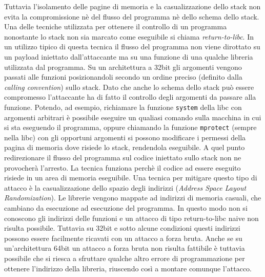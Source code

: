Tuttavia l'isolamento delle pagine di memoria e la casualizzazione
dello stack non evita la compromissione nè del flusso del programma nè
dello schema dello stack. Una delle tecniche utilizzata per ottenere
il controllo di un programma nonostante lo stack non sia marcato come
eseguibile si chiama \emph{return-to-libc}\cite{c0ntex}. In un
utilizzo tipico di questa tecnica il flusso del programma non viene
dirottato su un payload iniettato dall'attaccante ma su una funzione
di una qualche libreria utilizzata dal programma. Su un architettura a
32bit gli argomenti vengono passati alle funzioni posizionandoli
secondo un ordine preciso (definito dalla \emph{calling convention})
sullo stack. Dato che anche lo schema dello stack può essere
compromesso l'attaccante ha di fatto il controllo degli argomenti da
passare alla funzione. Potendo, ad esempio, richiamare la funzione
\lstinline{system} della libc con argomenti arbitrari è possibile
eseguire un qualiasi comando sulla macchina in cui si sta eseguendo il
programma, oppure chiamando la funzione \lstinline{mprotect} (sempre
nella libc) con gli opportuni argomenti si possono modificare i
permessi della pagina di memoria dove risiede lo stack, rendendola
eseguibile. A quel punto redirezionare il flusso del programma sul
codice iniettato sullo stack non ne provocherà l'arresto. La tecnica
funziona perchè il codice ad essere eseguito risiede in un area di
memoria eseguibile. Una tecnica per mitigare questo tipo di attacco è
la casualizzazione dello spazio degli indirizzi (\emph{Address Space
  Layout Randomization}). Le librerie vengono mappate ad indirizzi di
memoria casuali, che cambiano da esecuzione ad esecuzione del
programma. In questo modo non si conoscono gli indirizzi delle
funzioni e un attacco di tipo return-to-libc naive non risulta
possibile. Tuttavia su 32bit e sotto alcune condizioni questi
indirizzi possono essere facilmente ricavati con un attacco a forza
bruta\cite{Shacham:2004}. Anche se su un'architettura 64bit un attacco
a forza bruta non risulta fattibile è tuttavia possibile che si riesca
a sfruttare qualche altro errore di programmazione per ottenere
l'indirizzo della libreria, riuscendo così a montare comunque
l'attacco.

